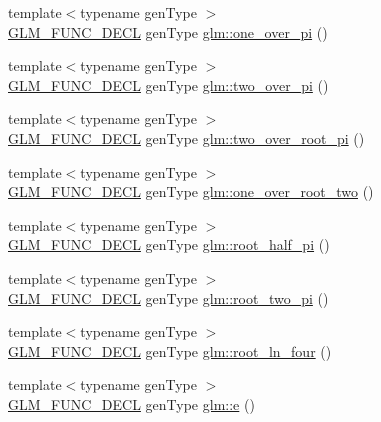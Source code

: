 \begin{DoxyCompactItemize}
\item 
{\footnotesize template$<$typename gen\+Type $>$ }\\\hyperlink{setup_8hpp_ab2d052de21a70539923e9bcbf6e83a51}{G\+L\+M\+\_\+\+F\+U\+N\+C\+\_\+\+D\+E\+CL} gen\+Type \hyperlink{group__gtc__constants_ga9ba09a027db6d4f4e259b01cf5d6c178}{glm\+::one\+\_\+over\+\_\+pi} ()
\item 
{\footnotesize template$<$typename gen\+Type $>$ }\\\hyperlink{setup_8hpp_ab2d052de21a70539923e9bcbf6e83a51}{G\+L\+M\+\_\+\+F\+U\+N\+C\+\_\+\+D\+E\+CL} gen\+Type \hyperlink{group__gtc__constants_ga85729d38c47351686e8659f80447a7ea}{glm\+::two\+\_\+over\+\_\+pi} ()
\item 
{\footnotesize template$<$typename gen\+Type $>$ }\\\hyperlink{setup_8hpp_ab2d052de21a70539923e9bcbf6e83a51}{G\+L\+M\+\_\+\+F\+U\+N\+C\+\_\+\+D\+E\+CL} gen\+Type \hyperlink{group__gtc__constants_ga767e539c20585bf60aa63595b0f0b259}{glm\+::two\+\_\+over\+\_\+root\+\_\+pi} ()
\item 
{\footnotesize template$<$typename gen\+Type $>$ }\\\hyperlink{setup_8hpp_ab2d052de21a70539923e9bcbf6e83a51}{G\+L\+M\+\_\+\+F\+U\+N\+C\+\_\+\+D\+E\+CL} gen\+Type \hyperlink{group__gtc__constants_gac1a9b3248357fd9e9b740bed90e0b1b7}{glm\+::one\+\_\+over\+\_\+root\+\_\+two} ()
\item 
{\footnotesize template$<$typename gen\+Type $>$ }\\\hyperlink{setup_8hpp_ab2d052de21a70539923e9bcbf6e83a51}{G\+L\+M\+\_\+\+F\+U\+N\+C\+\_\+\+D\+E\+CL} gen\+Type \hyperlink{group__gtc__constants_gaec5af85e2148c118aad7e797430fdeb0}{glm\+::root\+\_\+half\+\_\+pi} ()
\item 
{\footnotesize template$<$typename gen\+Type $>$ }\\\hyperlink{setup_8hpp_ab2d052de21a70539923e9bcbf6e83a51}{G\+L\+M\+\_\+\+F\+U\+N\+C\+\_\+\+D\+E\+CL} gen\+Type \hyperlink{group__gtc__constants_gae991b4d39c57b57990054eec3677597c}{glm\+::root\+\_\+two\+\_\+pi} ()
\item 
{\footnotesize template$<$typename gen\+Type $>$ }\\\hyperlink{setup_8hpp_ab2d052de21a70539923e9bcbf6e83a51}{G\+L\+M\+\_\+\+F\+U\+N\+C\+\_\+\+D\+E\+CL} gen\+Type \hyperlink{group__gtc__constants_ga9cae3fad9314e34c1d3aab71fcdef05f}{glm\+::root\+\_\+ln\+\_\+four} ()
\item 
{\footnotesize template$<$typename gen\+Type $>$ }\\\hyperlink{setup_8hpp_ab2d052de21a70539923e9bcbf6e83a51}{G\+L\+M\+\_\+\+F\+U\+N\+C\+\_\+\+D\+E\+CL} gen\+Type \hyperlink{group__gtc__constants_gab83fb6de0f05d6c0d11bdf0479f8319e}{glm\+::e} ()

\end{DoxyCompactItemize}
